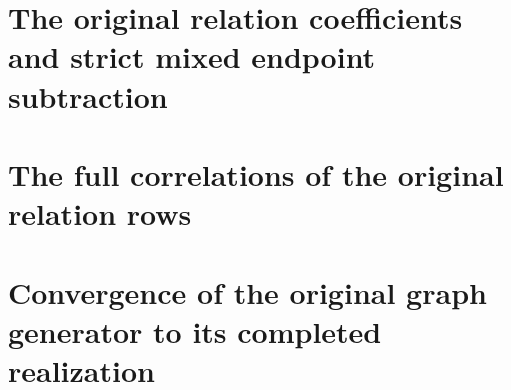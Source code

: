 \documentclass[11pt,a4paper,oneside,openany]{book}
\theoremstyle{definition}
\begin{document}
\chapter{The original relation coefficients and strict mixed endpoint subtraction}
\begingroup

\endgroup
\chapter{The full correlations of the original relation rows}
\begingroup

\endgroup
\chapter{Convergence of the original graph generator to its completed realization}
\begingroup

\endgroup
\end{document}

